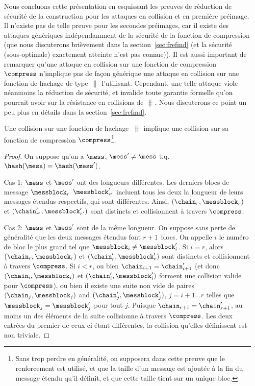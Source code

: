 Nous concluons cette présentation en esquissant les preuves de réduction de sécurité de la construction \merkdam pour les attaques en collision
et en première préimage. Il n'existe pas de telle preuve pour les secondes préimages, car il existe des attaques génériques indépendamment
de la sécurité de la fonction de compression (que nous discuterons brièvement dans la section~\ref{sec:frefmd} (et la sécurité (sous-optimale) exactement
atteinte n'est pas connue)).
Il est aussi important de remarquer qu'une attaque en collision sur une fonction de compression $\compress$ n'implique pas de façon
générique une attaque en collision sur
une fonction de hachage de type \merkdam $\hash$ l'utilisant. Cependant, une telle attaque viole néanmoins la réduction de sécurité, et invalide toute garantie
formelle qu'on pourrait avoir sur la résistance en collisions de $\hash$. Nous discuterons ce point un peu plus en détails dans la section~\ref{sec:frefmd}.

\begin{prop}
Une collision sur une fonction de hachage \merkdam $\hash$ implique une collision sur sa fonction de compression
$\compress$\footnote{Sans trop perdre en généralité, on supposera dans cette preuve que le renforcement \merkdam est utilisé, et que la taille
d'un message est ajoutée à la fin du message étendu qu'il définit, et que cette taille tient sur un unique bloc.}.
\end{prop}
\begin{proof}
On suppose qu'on a
$\mess$, $\mess' \neq \mess$ t.q. $\hash(\mess) = \hash(\mess')$.

Cas 1: $\mess$ et $\mess'$ ont des longueurs différentes.
Les derniers blocs de message $\messblock_r$
$\messblock'_{r'}$ incluent tous les deux la longueur de leurs messages étendus respectifs, qui sont différentes.
Ainsi,
$(\chain_r,\messblock_r)$ et $(\chain'_{r'}, \messblock'_{r'})$ sont distincts et collisionnent à travers $\compress$.

Cas 2: $\mess$ et $\mess'$
sont de la même longueur.
On suppose sans perte de généralité que les deux messages étendus font
$r + 1$ blocs.
On appelle $i$ le numéro de bloc le plus grand tel que
$\messblock_{i} \neq \messblock'_{i}$.
Si 
$i = r$, alors $(\chain_r,\messblock_r)$ et $(\chain'_{r}, \messblock'_{r})$
sont distincts et collisionnent à travers
$\compress$.
Si
$i < r$, ou bien $\chain_{i+1} = \chain'_{i+1}$ (et donc $(\chain_i,\messblock_i)$ et $(\chain'_{i}, \messblock'_{i})$
forment une collision valide  pour $\compress$), ou bien il existe une suite non vide de paires $(\chain_j, \messblock_j)$ and $(\chain'_j, \messblock'_j)$,
$j = i+1\ldots r$ telles que $\messblock_j = \messblock'_j$ pour tout $j$.
Puisque $\chain_{r+1} = \chain'_{r+1}$, au moins un des éléments de la suite collisionne à travers
$\compress$. Les deux entrées du premier de ceux-ci étant différentes, la collision qu'elles définissent est non triviale.
\end{proof}

